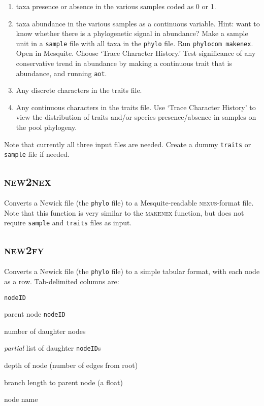 \documentclass[12pt,letterpaper]{article}
\begin{document}
\begin{enumerate}
\item taxa presence or absence in the various samples coded as 0 or 1.
\item taxa abundance in the various samples as a continuous
  variable. Hint: want to know whether there is a phylogenetic signal
  in abundance? Make a sample unit in a \verb|sample| file with all
  taxa in the \verb|phylo| file. Run \verb|phylocom makenex|. Open in
  Mesquite. Choose `Trace Character History.' Test significance of any
  conservative trend in abundance by making a continuous trait that is
  abundance, and running \verb|aot|.
\item Any discrete characters in the traits file.
\item Any continuous characters in the traits file. 
Use `Trace Character History' to view the distribution of traits
and/or species presence/absence in samples on the pool phylogeny.
\end{enumerate}

Note that currently all three input files are needed.  Create a dummy
\verb|traits| or \verb|sample| file if needed.

\subsection{\scshape new2nex}

Converts a Newick file (the \verb|phylo| file) to a Mesquite-readable
{\scshape nexus}-format file. Note that this function is very similar
to the {\scshape makenex} function, but does not require \verb|sample| and
\verb|traits| files as input.

\subsection{\scshape new2fy}

Converts a Newick file (the \verb|phylo| file) to a simple tabular
format, with each node as a row.  Tab-delimited columns are:
\begin{compactitem}
\item \verb|nodeID|
\item parent node \verb|nodeID|
\item number of daughter nodes
\item {\it partial} list of daughter \verb|nodeID|s
\item depth of node (number of edges from root)
\item branch length to parent node (a float)
\item node name
\end{compactitem}
\end{document}
